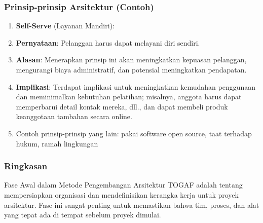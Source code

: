 \documentclass[aspectratio=169]{beamer}
\begin{document}
	\begin{frame}
		\frametitle{Prinsip-prinsip Arsitektur (Contoh)}
		\begin{enumerate}
			\item \textbf{Self-Serve} (Layanan Mandiri):
			\item \textbf{Pernyataan}: Pelanggan harus dapat melayani diri sendiri.
			\item \textbf{Alasan}: Menerapkan prinsip ini akan meningkatkan kepuasan pelanggan, mengurangi biaya administratif, dan potensial meningkatkan pendapatan.
			\item \textbf{Implikasi}: Terdapat implikasi untuk meningkatkan kemudahan penggunaan dan meminimalkan kebutuhan pelatihan; misalnya, anggota harus dapat memperbarui detail kontak mereka, dll., dan dapat membeli produk keanggotaan tambahan secara online.
			\item Contoh prinsip-prinsip yang lain: pakai software open source, taat terhadap hukum, ramah lingkungan
		\end{enumerate}
	\end{frame}
	
	\begin{frame}
		\frametitle{Ringkasan}
		Fase Awal dalam Metode Pengembangan Arsitektur TOGAF adalah tentang mempersiapkan organisasi dan mendefinisikan kerangka kerja untuk proyek arsitektur. Fase ini sangat penting untuk memastikan bahwa tim, proses, dan alat yang tepat ada di tempat sebelum proyek dimulai.
	\end{frame}
	
\end{document}
